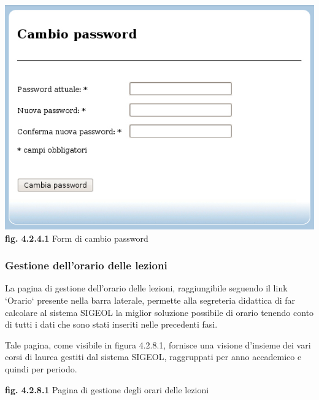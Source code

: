 \documentclass[11pt,a4paper]{article}
\begin{document}
\bigskip
\begin{center}
	\includegraphics[scale=0.5]{images/cambio_password.jpg}\\
	\textbf{fig. 4.2.4.1} Form di cambio password\\
\end{center}
\bigskip

\subsubsection{Gestione dell'orario delle lezioni}
La pagina di gestione dell'orario delle lezioni, raggiungibile seguendo il link `Orario` presente nella barra laterale, permette alla segreteria didattica di far calcolare al sistema SIGEOL la miglior soluzione possibile di orario tenendo conto di tutti i dati che sono stati inseriti nelle precedenti fasi.

Tale pagina, come visibile in figura 4.2.8.1, fornisce una visione d'insieme dei vari corsi di laurea gestiti dal sistema SIGEOL, raggruppati per anno accademico e quindi per periodo.

\bigskip
\begin{center}
	\textbf{fig. 4.2.8.1} Pagina di gestione degli orari delle lezioni\\
\end{center}
\bigskip
\end{document}
